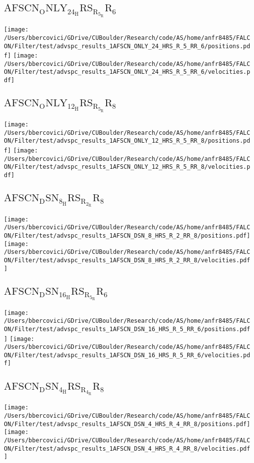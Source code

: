 \subsection{$\mathrm{AFSCN_ONLY_24_HRS_R_5_RR_6}$}
\texttt{[image: /Users/bbercovici/GDrive/CUBoulder/Research/code/AS/home/anfr8485/FALCON/Filter/test/advspc\_results\_1AFSCN\_ONLY\_24\_HRS\_R\_5\_RR\_6/positions.pdf]}
\texttt{[image: /Users/bbercovici/GDrive/CUBoulder/Research/code/AS/home/anfr8485/FALCON/Filter/test/advspc\_results\_1AFSCN\_ONLY\_24\_HRS\_R\_5\_RR\_6/velocities.pdf]}
\subsection{$\mathrm{AFSCN_ONLY_12_HRS_R_5_RR_8}$}
\texttt{[image: /Users/bbercovici/GDrive/CUBoulder/Research/code/AS/home/anfr8485/FALCON/Filter/test/advspc\_results\_1AFSCN\_ONLY\_12\_HRS\_R\_5\_RR\_8/positions.pdf]}
\texttt{[image: /Users/bbercovici/GDrive/CUBoulder/Research/code/AS/home/anfr8485/FALCON/Filter/test/advspc\_results\_1AFSCN\_ONLY\_12\_HRS\_R\_5\_RR\_8/velocities.pdf]}
\subsection{$\mathrm{AFSCN_DSN_8_HRS_R_2_RR_8}$}
\texttt{[image: /Users/bbercovici/GDrive/CUBoulder/Research/code/AS/home/anfr8485/FALCON/Filter/test/advspc\_results\_1AFSCN\_DSN\_8\_HRS\_R\_2\_RR\_8/positions.pdf]}
\texttt{[image: /Users/bbercovici/GDrive/CUBoulder/Research/code/AS/home/anfr8485/FALCON/Filter/test/advspc\_results\_1AFSCN\_DSN\_8\_HRS\_R\_2\_RR\_8/velocities.pdf]}
\subsection{$\mathrm{AFSCN_DSN_16_HRS_R_5_RR_6}$}
\texttt{[image: /Users/bbercovici/GDrive/CUBoulder/Research/code/AS/home/anfr8485/FALCON/Filter/test/advspc\_results\_1AFSCN\_DSN\_16\_HRS\_R\_5\_RR\_6/positions.pdf]}
\texttt{[image: /Users/bbercovici/GDrive/CUBoulder/Research/code/AS/home/anfr8485/FALCON/Filter/test/advspc\_results\_1AFSCN\_DSN\_16\_HRS\_R\_5\_RR\_6/velocities.pdf]}
\subsection{$\mathrm{AFSCN_DSN_4_HRS_R_4_RR_8}$}
\texttt{[image: /Users/bbercovici/GDrive/CUBoulder/Research/code/AS/home/anfr8485/FALCON/Filter/test/advspc\_results\_1AFSCN\_DSN\_4\_HRS\_R\_4\_RR\_8/positions.pdf]}
\texttt{[image: /Users/bbercovici/GDrive/CUBoulder/Research/code/AS/home/anfr8485/FALCON/Filter/test/advspc\_results\_1AFSCN\_DSN\_4\_HRS\_R\_4\_RR\_8/velocities.pdf]}
